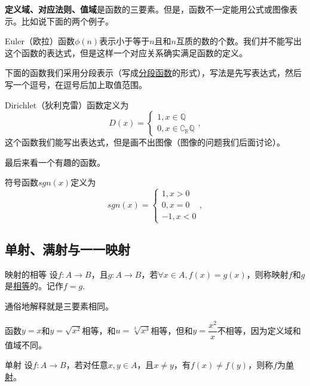 \documentclass[lang=cn,math=cm,chinesefont=nofont,11pt,scheme=chinese,twocol]{elegantbook}
\begin{document}
\begin{spacing}{2.0}
  \textbf{定义域、对应法则、值域}是函数的三要素。但是，函数不一定能用公式或图像表示。比如说下面的两个例子。
\end{spacing}

\begin{example}
  Euler（欧拉）函数$\phi (n)$表示小于等于$n$且和$n$互质的数的个数。我们并不能写出这个函数的表达式，但是这样一个对应关系确实满足函数的定义。
\end{example}

下面的函数我们采用分段表示（写成\underline{分段函数}的形式），写法是先写表达式，然后写一个逗号，在逗号后加上取值范围。

\begin{example}
  Dirichlet（狄利克雷）函数定义为
  $$D(x)=
  \begin{cases}
    1,x\in\mathbb{Q}
    \\0,x\in\complement_{\mathbb{R}}\mathbb{Q}
  \end{cases},$$
  这个函数我们能写出表达式，但是画不出图像（图像的问题我们后面讨论）。
\end{example}

最后来看一个有趣的函数。

\begin{example}
  符号函数$sgn(x)$定义为
  $$sgn(x)=
  \begin{cases}
    1,x>0
    \\0,x=0
    \\-1,x<0
  \end{cases},$$
\end{example}

\subsection{单射、满射与一一映射}

\begin{definition}{映射的相等}
  设$f:A\rightarrow B$，且$g:A\rightarrow B$，若$\forall x\in A,f(x)=g(x)$，则称映射$f$和$g$是\underline{相等}的。记作$f=g$.
\end{definition}

通俗地解释就是三要素相同。

\begin{example}
  函数$y=x$和$y=\sqrt{x^2}$相等，和$u=\sqrt[3]{x^3}$相等，但和$y=\dfrac{x^2}{x}$不相等，因为定义域和值域不同。
\end{example}

\begin{definition}{单射}
  设$f:A\rightarrow B$，若对任意$x,y\in A$，且$x\neq y$，有$f(x)\neq f(y)$，则称$f$为\underline{单射}。
\end{definition}
\end{document}
